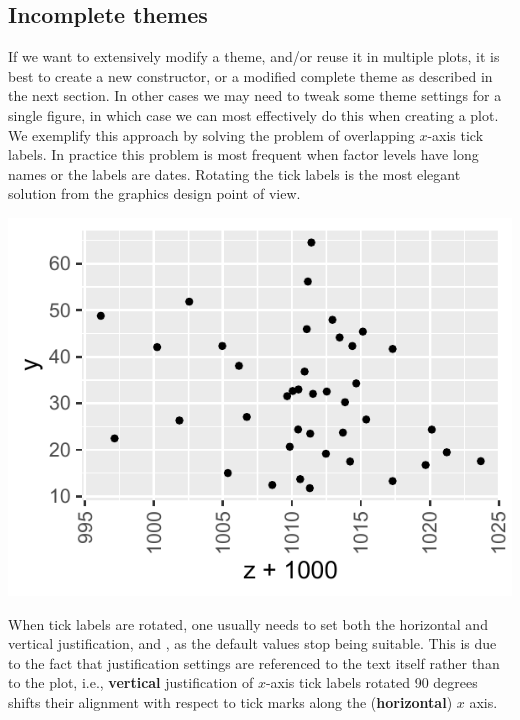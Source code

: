 \documentclass[krantz2]{krantz}\usepackage{knitr}
\begin{document}
\subsection{Incomplete themes}
If we want to extensively modify a theme, and/or reuse it in multiple plots, it is best to create a new constructor, or a modified complete theme as described in the next section. In other cases we may need to tweak some theme settings for a single figure, in which case we can most effectively do this when creating a plot. We exemplify this approach by solving the problem of overlapping $x$-axis tick labels. In practice this problem is most frequent when factor levels have long names or the labels are dates. Rotating the tick labels is the most elegant solution from the graphics design point of view.

\begin{knitrout}\footnotesize
{}\color{fgcolor}\begin{kframe}
\begin{alltt}
  \hlopt{+}  \hlopt{+}
  \hlstd{()} \hlopt{+}
  \hlstd{(} \hlopt{::}\hlstd{(} \hlstd{=} \hlstd{))} \hlopt{+}
  \hlstd{(} \hlstd{=} \hlstd{(} \hlstd{=} \hlstd{,}  \hlstd{=} \hlstd{,}  \hlstd{=} \hlstd{))}
\end{alltt}
\end{kframe}

{\centering \includegraphics[width=.495\textwidth]{figure/pos-themes-11-1} 

}


\end{knitrout}

\begin{warningbox}
When tick labels are rotated, one usually needs to set both the horizontal and vertical justification,  and , as the default values stop being suitable. This is due to the fact that justification settings are referenced to the text itself rather than to the plot, i.e., \textbf{vertical} justification of $x$-axis tick labels rotated 90 degrees shifts their alignment with respect to tick marks along the (\textbf{horizontal}) $x$ axis.
\end{warningbox}
\end{document}
